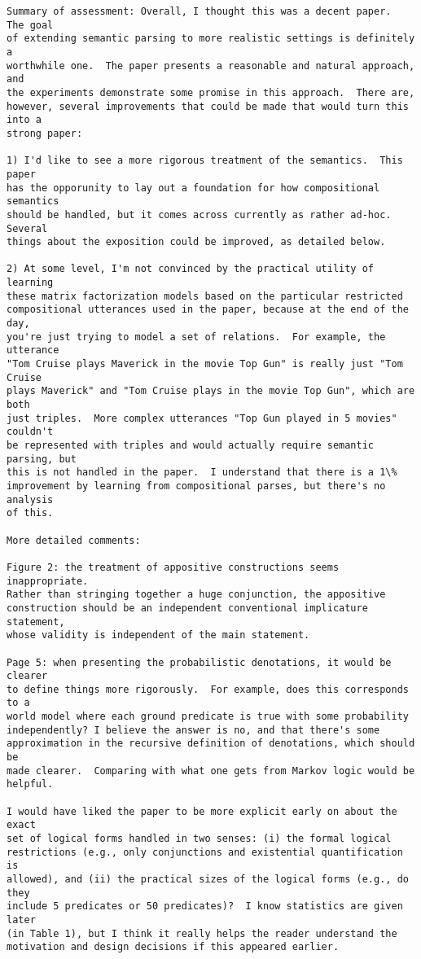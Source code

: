 \documentclass{article}[11pt,oneside]
\begin{document}
\begin{verbatim}
Summary of assessment: Overall, I thought this was a decent paper.  The goal
of extending semantic parsing to more realistic settings is definitely a
worthwhile one.  The paper presents a reasonable and natural approach, and
the experiments demonstrate some promise in this approach.  There are,
however, several improvements that could be made that would turn this into a
strong paper:

1) I'd like to see a more rigorous treatment of the semantics.  This paper
has the opporunity to lay out a foundation for how compositional semantics
should be handled, but it comes across currently as rather ad-hoc.  Several
things about the exposition could be improved, as detailed below.

2) At some level, I'm not convinced by the practical utility of learning
these matrix factorization models based on the particular restricted
compositional utterances used in the paper, because at the end of the day,
you're just trying to model a set of relations.  For example, the utterance
"Tom Cruise plays Maverick in the movie Top Gun" is really just "Tom Cruise
plays Maverick" and "Tom Cruise plays in the movie Top Gun", which are both
just triples.  More complex utterances "Top Gun played in 5 movies" couldn't
be represented with triples and would actually require semantic parsing, but
this is not handled in the paper.  I understand that there is a 1\%
improvement by learning from compositional parses, but there's no analysis
of this.

More detailed comments:

Figure 2: the treatment of appositive constructions seems inappropriate.
Rather than stringing together a huge conjunction, the appositive
construction should be an independent conventional implicature statement,
whose validity is independent of the main statement.

Page 5: when presenting the probabilistic denotations, it would be clearer
to define things more rigorously.  For example, does this corresponds to a
world model where each ground predicate is true with some probability
independently? I believe the answer is no, and that there's some
approximation in the recursive definition of denotations, which should be
made clearer.  Comparing with what one gets from Markov logic would be
helpful.

I would have liked the paper to be more explicit early on about the exact
set of logical forms handled in two senses: (i) the formal logical
restrictions (e.g., only conjunctions and existential quantification is
allowed), and (ii) the practical sizes of the logical forms (e.g., do they
include 5 predicates or 50 predicates)?  I know statistics are given later
(in Table 1), but I think it really helps the reader understand the
motivation and design decisions if this appeared earlier.


\end{verbatim}
\end{document}
